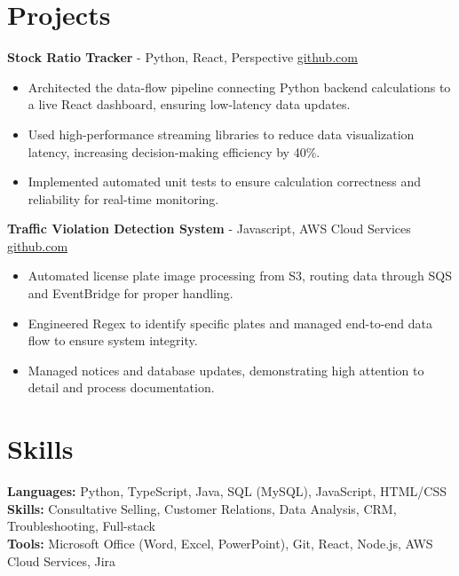 \documentclass[11pt]{article}       %
\begin{document}
\vspace{-18.5pt}

\section*{Projects}

\textbf{Stock Ratio Tracker}{ - Python, React, Perspective} \hfill \href{https://github.com/Monica20030707/tradingDashboard-UI}{github.com} \\
\vspace{-9pt}
\begin{itemize}
  \item Architected the data-flow pipeline connecting Python backend calculations to a live React dashboard, ensuring low-latency data updates. 
  \item Used high-performance streaming libraries to reduce data visualization latency, increasing decision-making efficiency by 40\%.
  \item Implemented automated unit tests to ensure calculation correctness and reliability for real-time monitoring.
\end{itemize}

\textbf{Traffic Violation Detection System}{ - Javascript, AWS Cloud Services} \hfill \href{https://github.com/Monica20030707/AWS_rekonigition-N-read-database}{github.com} \\
\vspace{-9pt}
\begin{itemize}
  \item Automated license plate image processing from S3, routing data through SQS and EventBridge for proper handling.
  \item Engineered Regex to identify specific plates and managed end-to-end data flow to ensure system integrity.
  \item Managed notices and database updates, demonstrating high attention to detail and process documentation.
\end{itemize}

\vspace{-18.5pt}


\section*{Skills}
\textbf{Languages:} Python, TypeScript, Java, SQL (MySQL), JavaScript, HTML/CSS\\
\textbf{Skills:} Consultative Selling, Customer Relations, Data Analysis, CRM, Troubleshooting, Full-stack\\
\textbf{Tools:} Microsoft Office (Word, Excel, PowerPoint), Git, React, Node.js, AWS Cloud Services, Jira\\

\vspace{-6.5pt}
\end{document}
